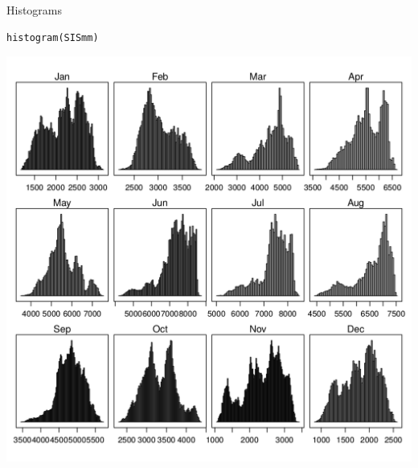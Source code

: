 \documentclass[xcolor={usenames,svgnames,dvipsnames}]{beamer}
\begin{document}
\begin{frame}[fragile,label=sec-15]{Histograms}
 \lstset{language=R,numbers=none}
\begin{lstlisting}
histogram(SISmm)
\end{lstlisting}

\begin{center}
\includegraphics[height=0.65\textheight]{figs/histogram.png}
\end{center}
\end{frame}
\end{document}
